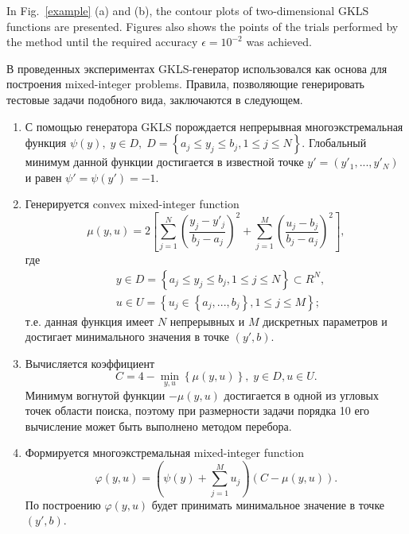 \documentclass[
11pt,%
tightenlines,%
twoside,%
onecolumn,%
nofloats,%
nobibnotes,%
nofootinbib,%
superscriptaddress,%
noshowpacs,%
centertags]%
{revtex4}
\begin{document}
In Fig.~\ref{example} (a) and (b), the contour plots of two-dimensional GKLS functions are presented. Figures also shows the points of the trials performed by the method until the required accuracy $\epsilon=10^{-2}$ was achieved.


В проведенных экспериментах GKLS-генератор использовался как основа для построения mixed-integer problems. Правила, позволяющие генерировать тестовые задачи подобного вида, заключаются в следующем.

\begin{enumerate}
	\item С помощью генератора GKLS порождается непрерывная многоэкстремальная функция $\psi(y), \; y\in D, \; D = \left\{ a_j\leq y_j\leq b_j, 1\leq j \leq N \right\}$. Глобальный минимум данной функции достигается в известной точке $y'=(y'_1,...,y'_N)$ и равен $\psi'=\psi(y')=-1$.
	\item Генерируется convex mixed-integer function 
	\[
			\mu(y,u) = 2 \left[ \sum_{j=1}^N \left( \frac{y_j - y'_j}{b_j-a_j} \right)^2 + \sum_{j=1}^M \left( \frac{u_j - b_j}{b_j-a_j} \right)^2 \right],
	\]
	где 
	\begin{eqnarray*}
	& y\in D = \left\{ a_j\leq y_j\leq b_j, 1\leq j \leq N \right\} \subset R^N, \\
	& u\in U = \left\{ u_j \in  \left\{a_j, ..., b_j \right\}, 1\leq j \leq M \right\};
	\end{eqnarray*}
	т.е. данная функция имеет $N$ непрерывных и $M$ дискретных параметров и достигает минимального значения в точке $(y',b)$.
	\item Вычисляется коэффициент 
	\[
	C = 4 - \min_{y,u} \left\{ \mu(y,u) \right\}, \; y\in D, u \in U.
	\]
	Минимум вогнутой функции $-\mu(y,u)$ достигается в одной из угловых точек области поиска, поэтому при размерности задачи порядка 10 его вычисление может быть выполнено методом перебора.
	\item Формируется многоэкстремальная mixed-integer function 
	\[
	\varphi(y,u) = \left(\psi(y) + \sum_{j=1}^M{u_j}\right)\left(C - \mu(y,u)\right).
	\]
	По построению $\varphi(y,u)$  будет принимать минимальное значение в точке $(y',b)$.
	
\end{enumerate}
\end{document}
